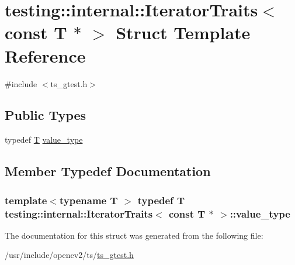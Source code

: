 \hypertarget{structtesting_1_1internal_1_1IteratorTraits_3_01const_01T_01_5_01_4}{\section{testing\-:\-:internal\-:\-:Iterator\-Traits$<$ const T $\ast$ $>$ Struct Template Reference}
\label{structtesting_1_1internal_1_1IteratorTraits_3_01const_01T_01_5_01_4}
}


{\ttfamily \#include $<$ts\-\_\-gtest.\-h$>$}

\subsection*{Public Types}
\begin{DoxyCompactItemize}
\item 
typedef \hyperlink{calib3d_8hpp_a3efb9551a871ddd0463079a808916717}{T} \hyperlink{structtesting_1_1internal_1_1IteratorTraits_3_01const_01T_01_5_01_4_ae7c8867223e106f374b56a7dc4a85547}{value\-\_\-type}
\end{DoxyCompactItemize}


\subsection{Member Typedef Documentation}
\hypertarget{structtesting_1_1internal_1_1IteratorTraits_3_01const_01T_01_5_01_4_ae7c8867223e106f374b56a7dc4a85547}{
\subsubsection[{value\-\_\-type}]{\setlength{\rightskip}{0pt plus 5cm}template$<$typename T $>$ typedef {\bf T} {\bf testing\-::internal\-::\-Iterator\-Traits}$<$ const {\bf T} $\ast$ $>$\-::{\bf value\-\_\-type}}}\label{structtesting_1_1internal_1_1IteratorTraits_3_01const_01T_01_5_01_4_ae7c8867223e106f374b56a7dc4a85547}


The documentation for this struct was generated from the following file\-:\begin{DoxyCompactItemize}
\item 
/usr/include/opencv2/ts/\hyperlink{ts__gtest_8h}{ts\-\_\-gtest.\-h}\end{DoxyCompactItemize}
